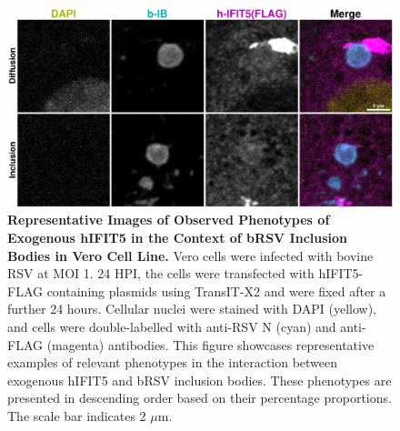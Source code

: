 \begin{figure}
    \centering
    \includegraphics[width=1\linewidth]{09. Chapter 4/Figs/02. Overexpression/04. IFIT5/06. i5-brsv.pdf}
    \caption[Representative Images of Observed Phenotypes of Exogenous hIFIT5 in the Context of bRSV Inclusion Bodies in Vero Cell Line.]{\textbf{Representative Images of Observed Phenotypes of Exogenous hIFIT5 in the Context of bRSV Inclusion Bodies in Vero Cell Line.} Vero cells were infected with bovine RSV at MOI 1. 24 HPI, the cells were transfected with hIFIT5-FLAG containing plasmids using TransIT-X2 and were fixed after a further 24 hours. Cellular nuclei were stained with DAPI (yellow), and cells were double-labelled with anti-RSV N (cyan) and anti-FLAG (magenta) antibodies. This figure showcases representative examples of relevant phenotypes in the interaction between exogenous hIFIT5 and bRSV inclusion bodies. These phenotypes are presented in descending order based on their percentage proportions. The scale bar indicates 2 \(\mu \mbox{m}\).}
    \label{fig:Representative Images of Observed Phenotypes of Exogenous hIFIT5 in the Context of bRSV Inclusion Bodies in VERO Cell Line}
\end{figure}

